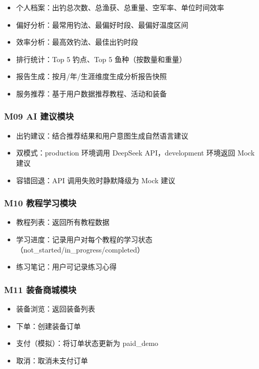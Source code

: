 \documentclass[12pt,a4paper]{ctexart}
\begin{document}
\begin{itemize}
  \item 个人档案：出钓总次数、总渔获、总重量、空军率、单位时间效率
  \item 偏好分析：最常用钓法、最偏好时段、最偏好温度区间
  \item 效率分析：最高效钓法、最佳出钓时段
  \item 排行统计：Top 5 钓点、Top 5 鱼种（按数量和重量）
  \item 报告生成：按月/年/生涯维度生成分析报告快照
  \item 服务推荐：基于用户数据推荐教程、活动和装备
\end{itemize}

\subsubsection{M09 AI 建议模块}

\begin{itemize}
  \item 出钓建议：结合推荐结果和用户意图生成自然语言建议
  \item 双模式：production 环境调用 DeepSeek API，development 环境返回 Mock 建议
  \item 容错回退：API 调用失败时静默降级为 Mock 建议
\end{itemize}

\subsubsection{M10 教程学习模块}

\begin{itemize}
  \item 教程列表：返回所有教程数据
  \item 学习进度：记录用户对每个教程的学习状态（not\_started/in\_progress/completed）
  \item 练习笔记：用户可记录练习心得
\end{itemize}

\subsubsection{M11 装备商城模块}

\begin{itemize}
  \item 装备浏览：返回装备列表
  \item 下单：创建装备订单
  \item 支付（模拟）：将订单状态更新为 paid\_demo
  \item 取消：取消未支付订单
\end{itemize}
\end{document}
